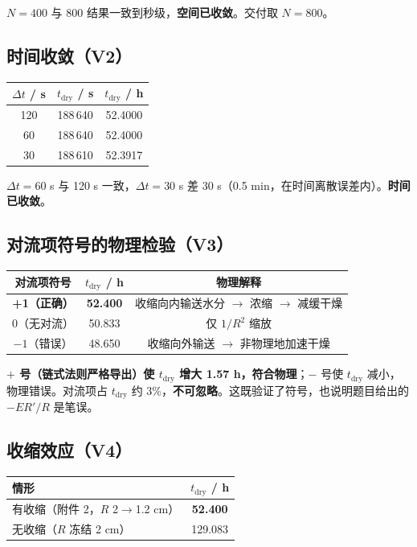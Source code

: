 \documentclass[11pt]{ctexart}
\begin{document}
$N=400$ 与 800 结果一致到秒级，\textbf{空间已收敛}。交付取 $N=800$。

\subsection{时间收敛（V2）}

\begin{center}
\begin{tabular}{ccc}
\toprule
$\Delta t$ / s & $t_\text{dry}$ / s & $t_\text{dry}$ / h \\
\midrule
120 & 188\,640 & 52.4000 \\
60 & 188\,640 & 52.4000 \\
30 & 188\,610 & 52.3917 \\
\bottomrule
\end{tabular}
\end{center}

$\Delta t = 60$ s 与 120 s 一致，$\Delta t = 30$ s 差 30 s（0.5 min，在时间离散误差内）。\textbf{时间已收敛}。

\subsection{对流项符号的物理检验（V3）}

\begin{center}
\begin{tabular}{ccc}
\toprule
对流项符号 & $t_\text{dry}$ / h & 物理解释 \\
\midrule
\textbf{+1（正确）} & \textbf{52.400} & 收缩向内输送水分 $\to$ 浓缩 $\to$ 减缓干燥 \\
0（无对流） & 50.833 & 仅 $1/R^2$ 缩放 \\
$-1$（错误） & 48.650 & 收缩向外输送 $\to$ 非物理地加速干燥 \\
\bottomrule
\end{tabular}
\end{center}

\textbf{$+$ 号（链式法则严格导出）使 $t_\text{dry}$ 增大 1.57 h，符合物理}；$-$ 号使 $t_\text{dry}$ 减小，物理错误。对流项占 $t_\text{dry}$ 约 3\%，\textbf{不可忽略}。这既验证了符号，也说明题目给出的 $-E R'/R$ 是笔误。

\subsection{收缩效应（V4）}

\begin{center}
\begin{tabular}{lc}
\toprule
情形 & $t_\text{dry}$ / h \\
\midrule
有收缩（附件 2，$R$ 2$\to$1.2 cm） & \textbf{52.400} \\
无收缩（$R$ 冻结 2 cm） & 129.083 \\
\bottomrule
\end{tabular}
\end{center}
\end{document}
